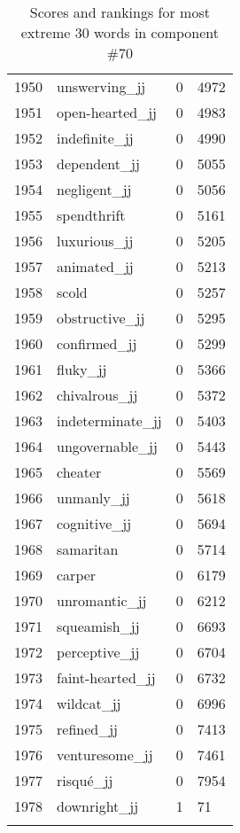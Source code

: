 \begin{longtable}[!htbp]{| rlr@{.}l |}
    1950 & unswerving\_jj & 0 & 4972 \\
    1951 & open-hearted\_jj & 0 & 4983 \\
    1952 & indefinite\_jj & 0 & 4990 \\
    1953 & dependent\_jj & 0 & 5055 \\
    1954 & negligent\_jj & 0 & 5056 \\
    1955 & spendthrift & 0 & 5161 \\
    1956 & luxurious\_jj & 0 & 5205 \\
    1957 & animated\_jj & 0 & 5213 \\
    1958 & scold & 0 & 5257 \\
    1959 & obstructive\_jj & 0 & 5295 \\
    1960 & confirmed\_jj & 0 & 5299 \\
    1961 & fluky\_jj & 0 & 5366 \\
    1962 & chivalrous\_jj & 0 & 5372 \\
    1963 & indeterminate\_jj & 0 & 5403 \\
    1964 & ungovernable\_jj & 0 & 5443 \\
    1965 & cheater & 0 & 5569 \\
    1966 & unmanly\_jj & 0 & 5618 \\
    1967 & cognitive\_jj & 0 & 5694 \\
    1968 & samaritan & 0 & 5714 \\
    1969 & carper & 0 & 6179 \\
    1970 & unromantic\_jj & 0 & 6212 \\
    1971 & squeamish\_jj & 0 & 6693 \\
    1972 & perceptive\_jj & 0 & 6704 \\
    1973 & faint-hearted\_jj & 0 & 6732 \\
    1974 & wildcat\_jj & 0 & 6996 \\
    1975 & refined\_jj & 0 & 7413 \\
    1976 & venturesome\_jj & 0 & 7461 \\
    1977 & risqué\_jj & 0 & 7954 \\
    1978 & downright\_jj & 1 & 71 \\
    \hline
    \caption{Scores and rankings for most extreme 30 words in component \#70} \\
\end{longtable}
